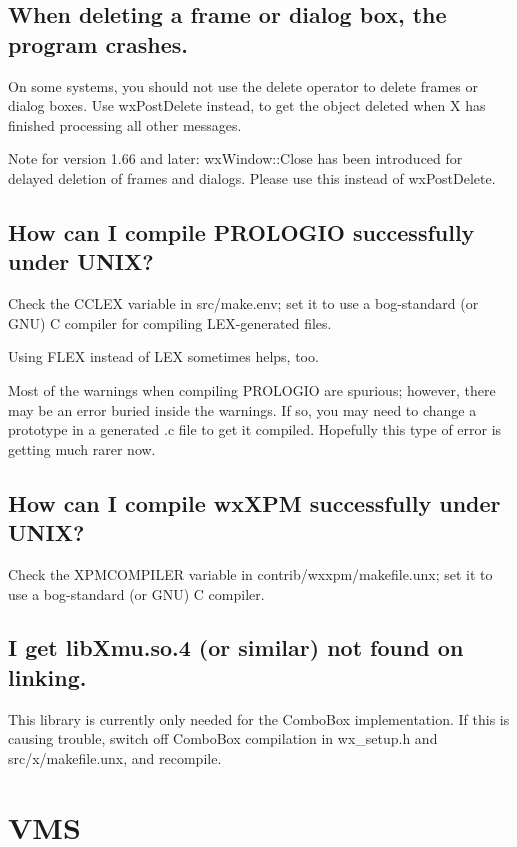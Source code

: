 \subsection{When deleting a frame or dialog box, the program crashes.}

On some systems, you should not use the delete operator to delete
frames or dialog boxes. Use wxPostDelete instead, to get the object
deleted when X has finished processing all other messages.

Note for version 1.66 and later: wxWindow::Close has been introduced for
delayed deletion of frames and dialogs. Please use this instead of wxPostDelete.

\subsection{How can I compile PROLOGIO successfully under UNIX?}

Check the CCLEX variable in src/make.env; set it to use a bog-standard
(or GNU) C compiler for compiling LEX-generated files.

Using FLEX instead of LEX sometimes helps, too.

Most of the warnings when compiling PROLOGIO are spurious; however,
there may be an error buried inside the warnings. If so, you may need
to change a prototype in a generated .c file to get it compiled.
Hopefully this type of error is getting much rarer now.

\subsection{How can I compile wxXPM successfully under UNIX?}

Check the XPMCOMPILER variable in contrib/wxxpm/makefile.unx; set it to use a bog-standard
(or GNU) C compiler.

\subsection{I get libXmu.so.4 (or similar) not found on linking.}

This library is currently only needed for the ComboBox implementation. If this is causing trouble,
switch off ComboBox compilation in wx\_setup.h and src/x/makefile.unx, and recompile.

\section{VMS}

